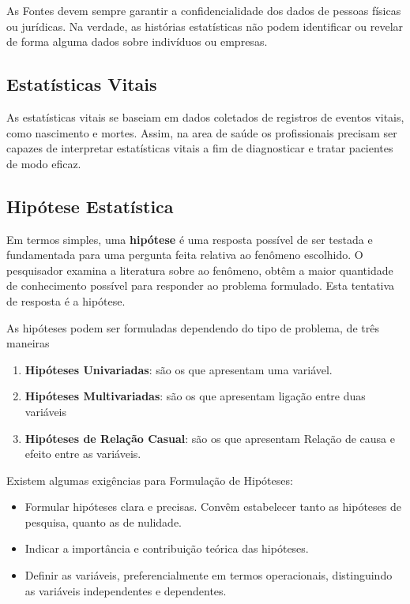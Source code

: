 As Fontes devem sempre garantir a confidencialidade dos dados de pessoas físicas ou jurídicas. Na verdade, as histórias estatísticas não podem identificar ou revelar de forma alguma dados sobre indivíduos ou empresas.\vskip0.3cm 





\subsection{Estatísticas Vitais}

As estatísticas vitais se baseiam em dados coletados de registros de eventos vitais, como nascimento e mortes. Assim, na area de saúde os profissionais precisam ser capazes de interpretar  estatísticas vitais a fim de diagnosticar e tratar pacientes de modo eficaz.








\subsection{Hipótese Estatística}

Em termos simples, uma \textbf{hipótese} é uma resposta possível de ser testada e fundamentada para uma pergunta feita relativa ao fenômeno escolhido. O pesquisador examina a literatura sobre ao fenômeno, obtêm a maior quantidade de conhecimento possível para responder ao problema formulado. Esta tentativa de resposta é a hipótese.\vskip0.3cm    

As hipóteses podem ser formuladas dependendo do tipo de problema, de três maneiras


\begin{enumerate}
\item \textbf{Hipóteses Univariadas}: são os que apresentam uma variável.  
\item \textbf{Hipóteses Multivariadas}: são os que apresentam ligação entre duas variáveis
\item \textbf{Hipóteses de Relação Casual}: são os que apresentam Relação de causa e efeito entre as variáveis.
\end{enumerate}


Existem algumas exigências para Formulação de Hipóteses:

\begin{itemize}
\item Formular hipóteses clara e precisas. Convêm estabelecer tanto as hipóteses de pesquisa, quanto as de nulidade.  
\item Indicar a importância e contribuição teórica das hipóteses.
\item Definir as variáveis, preferencialmente em termos operacionais, distinguindo as variáveis independentes e dependentes. 
\end{itemize}

